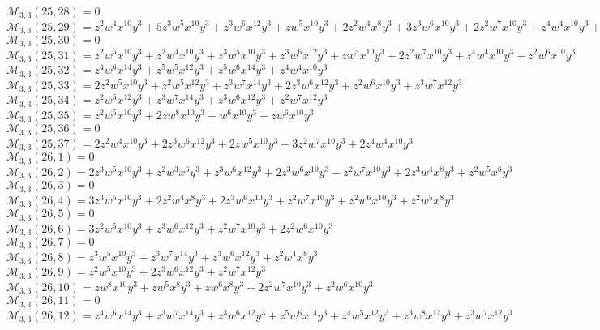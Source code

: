 \documentclass[12pt]{memoireuqam1.3}
\begin{document}
$\mathcal{M}_{3,3}(25,28)=0$\\
$\mathcal{M}_{3,3}(25,29)=z^2w^4x^{10}y^3+5z^3w^5x^{10}y^3+z^3w^6x^{12}y^3+zw^5x^{10}y^3+2z^2w^4x^8y^3+3z^3w^6x^{10}y^3+2z^2w^7x^{10}y^3+z^4w^4x^{10}y^3+z^2w^5x^8y^3$\\
$\mathcal{M}_{3,3}(25,30)=0$\\
$\mathcal{M}_{3,3}(25,31)=z^2w^5x^{10}y^3+z^2w^4x^{10}y^3+z^3w^5x^{10}y^3+z^3w^6x^{12}y^3+zw^5x^{10}y^3+2z^2w^7x^{10}y^3+z^4w^4x^{10}y^3+z^2w^6x^{10}y^3$\\
$\mathcal{M}_{3,3}(25,32)=z^4w^6x^{14}y^3+z^5w^5x^{12}y^3+z^5w^6x^{14}y^3+z^4w^4x^{10}y^3$\\
$\mathcal{M}_{3,3}(25,33)=2z^2w^5x^{10}y^3+z^2w^5x^{12}y^3+z^3w^7x^{14}y^3+2z^3w^6x^{12}y^3+z^2w^6x^{10}y^3+z^3w^7x^{12}y^3$\\
$\mathcal{M}_{3,3}(25,34)=z^2w^5x^{12}y^3+z^3w^7x^{14}y^3+z^3w^6x^{12}y^3+z^2w^7x^{12}y^3$\\
$\mathcal{M}_{3,3}(25,35)=z^2w^5x^{10}y^3+2zw^8x^{10}y^3+w^6x^{10}y^3+zw^6x^{10}y^3$\\
$\mathcal{M}_{3,3}(25,36)=0$\\
$\mathcal{M}_{3,3}(25,37)=2z^2w^4x^{10}y^3+2z^3w^6x^{12}y^3+2zw^5x^{10}y^3+3z^2w^7x^{10}y^3+2z^4w^4x^{10}y^3$\\
$\mathcal{M}_{3,3}(26,1)=0$\\
$\mathcal{M}_{3,3}(26,2)=2z^3w^5x^{10}y^3+z^2w^3x^6y^3+z^3w^6x^{12}y^3+2z^3w^6x^{10}y^3+z^2w^7x^{10}y^3+2z^3w^4x^8y^3+z^2w^5x^8y^3$\\
$\mathcal{M}_{3,3}(26,3)=0$\\
$\mathcal{M}_{3,3}(26,4)=3z^3w^5x^{10}y^3+2z^2w^4x^8y^3+2z^3w^6x^{10}y^3+z^2w^7x^{10}y^3+z^2w^6x^{10}y^3+z^2w^5x^8y^3$\\
$\mathcal{M}_{3,3}(26,5)=0$\\
$\mathcal{M}_{3,3}(26,6)=3z^2w^5x^{10}y^3+z^3w^6x^{12}y^3+z^2w^7x^{10}y^3+2z^2w^6x^{10}y^3$\\
$\mathcal{M}_{3,3}(26,7)=0$\\
$\mathcal{M}_{3,3}(26,8)=z^3w^5x^{10}y^3+z^3w^7x^{14}y^3+z^3w^6x^{12}y^3+z^2w^4x^8y^3$\\
$\mathcal{M}_{3,3}(26,9)=z^2w^5x^{10}y^3+2z^3w^6x^{12}y^3+z^2w^7x^{12}y^3$\\
$\mathcal{M}_{3,3}(26,10)=zw^8x^{10}y^3+zw^5x^8y^3+zw^6x^8y^3+2z^2w^7x^{10}y^3+z^2w^6x^{10}y^3$\\
$\mathcal{M}_{3,3}(26,11)=0$\\
$\mathcal{M}_{3,3}(26,12)=z^4w^6x^{14}y^3+z^3w^7x^{14}y^3+z^3w^6x^{12}y^3+z^5w^6x^{14}y^3+z^4w^5x^{12}y^3+z^3w^8x^{12}y^3+z^3w^7x^{12}y^3$\\
\end{document}
